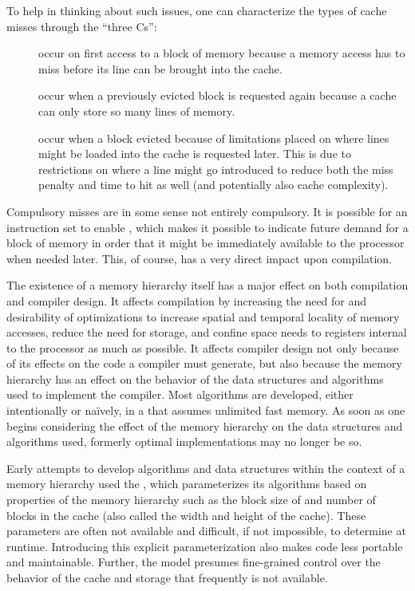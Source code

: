 To help in thinking about such issues, one can characterize the types of cache misses through the ``three Cs'':
\begin{description}
\item[] occur on first access to a block of memory because a memory access has to miss before its line can be brought into the cache.
\item[] occur when a previously evicted block is requested again because a cache can only store so many lines of memory.
\item[] occur when a block evicted because of limitations placed on where lines might be loaded into the cache is requested later. This is due to restrictions on where a line might go introduced to reduce both the miss penalty and time to hit as well (and potentially also cache complexity).
\end{description}
Compulsory misses are in some sense not entirely compulsory. It is possible for an instruction set to enable , which makes it possible to indicate future demand for a block of memory in order that it might be immediately available to the processor when needed later. This, of course, has a very direct impact upon compilation.

The existence of a memory hierarchy itself has a major effect on both compilation and compiler design. It affects compilation by increasing the need for and desirability of optimizations to increase spatial and temporal locality of memory accesses, reduce the need for storage, and confine space needs to registers internal to the processor as much as possible. It affects compiler design not only because of its effects on the code a compiler must generate, but also because the memory hierarchy has an effect on the behavior of the data structures and algorithms used to implement the compiler. Most algorithms are developed, either intentionally or na\"ively, in a  that assumes unlimited fast memory. As soon as one begins considering the effect of the memory hierarchy on the data structures and algorithms used, formerly optimal implementations may no longer be so.

Early attempts to develop algorithms and data structures within the context of a memory hierarchy used the , which parameterizes its algorithms based on properties of the memory hierarchy such as the block size of and number of blocks in the cache (also called the width and height of the cache). These parameters are often not available and difficult, if not impossible, to determine at runtime. Introducing this explicit parameterization also makes code less portable and maintainable. Further, the model presumes fine-grained control over the behavior of the cache and storage that frequently is not available.

